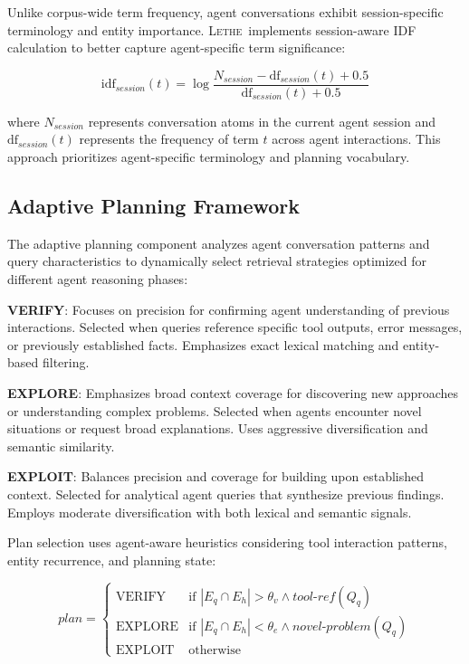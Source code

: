 \documentclass[letterpaper]{article}
\newcommand{\lethe}{\textsc{Lethe}}
\begin{document}
Unlike corpus-wide term frequency, agent conversations exhibit session-specific terminology and entity importance. \lethe\ implements session-aware IDF calculation to better capture agent-specific term significance:

\begin{equation}
\text{idf}_{session}(t) = \log \frac{N_{session} - \text{df}_{session}(t) + 0.5}{\text{df}_{session}(t) + 0.5}
\end{equation}

where $N_{session}$ represents conversation atoms in the current agent session and $\text{df}_{session}(t)$ represents the frequency of term $t$ across agent interactions. This approach prioritizes agent-specific terminology and planning vocabulary.

\subsection{Adaptive Planning Framework}

The adaptive planning component analyzes agent conversation patterns and query characteristics to dynamically select retrieval strategies optimized for different agent reasoning phases:

\textbf{VERIFY}: Focuses on precision for confirming agent understanding of previous interactions. Selected when queries reference specific tool outputs, error messages, or previously established facts. Emphasizes exact lexical matching and entity-based filtering.

\textbf{EXPLORE}: Emphasizes broad context coverage for discovering new approaches or understanding complex problems. Selected when agents encounter novel situations or request broad explanations. Uses aggressive diversification and semantic similarity.

\textbf{EXPLOIT}: Balances precision and coverage for building upon established context. Selected for analytical agent queries that synthesize previous findings. Employs moderate diversification with both lexical and semantic signals.

Plan selection uses agent-aware heuristics considering tool interaction patterns, entity recurrence, and planning state:

\begin{equation}
plan = \begin{cases}
\text{VERIFY} & \text{if } |E_q \cap E_h| > \theta_v \land tool\text{-}ref(Q_q) \\
\text{EXPLORE} & \text{if } |E_q \cap E_h| < \theta_e \land novel\text{-}problem(Q_q) \\
\text{EXPLOIT} & \text{otherwise}
\end{cases}
\end{equation}
\end{document}
